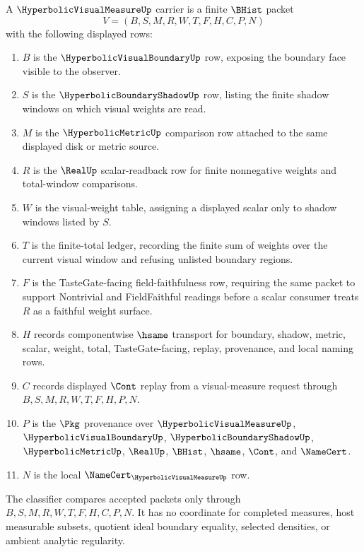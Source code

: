 \begin{definition}
\label{def:hyperbolic-visual-measure-carrier}
A $\HyperbolicVisualMeasureUp$ carrier is a finite $\BHist$ packet
$$
V=(B,S,M,R,W,T,F,H,C,P,N)
$$
with the following displayed rows:
\begin{enumerate}
\item $B$ is the $\HyperbolicVisualBoundaryUp$ row, exposing the boundary face visible to the observer.
\item $S$ is the $\HyperbolicBoundaryShadowUp$ row, listing the finite shadow windows on which visual weights are read.
\item $M$ is the $\HyperbolicMetricUp$ comparison row attached to the same displayed disk or metric source.
\item $R$ is the $\RealUp$ scalar-readback row for finite nonnegative weights and total-window comparisons.
\item $W$ is the visual-weight table, assigning a displayed scalar only to shadow windows listed by $S$.
\item $T$ is the finite-total ledger, recording the finite sum of weights over the current visual window and refusing unlisted boundary regions.
\item $F$ is the TasteGate-facing field-faithfulness row, requiring the same packet to support Nontrivial and FieldFaithful readings before a scalar consumer treats $R$ as a faithful weight surface.
\item $H$ records componentwise $\hsame$ transport for boundary, shadow, metric, scalar, weight, total, TasteGate-facing, replay, provenance, and local naming rows.
\item $C$ records displayed $\Cont$ replay from a visual-measure request through $B,S,M,R,W,T,F,H,P,N$.
\item $P$ is the $\Pkg$ provenance over $\HyperbolicVisualMeasureUp$, $\HyperbolicVisualBoundaryUp$, $\HyperbolicBoundaryShadowUp$, $\HyperbolicMetricUp$, $\RealUp$, $\BHist$, $\hsame$, $\Cont$, and $\NameCert$.
\item $N$ is the local $\NameCert_{\HyperbolicVisualMeasureUp}$ row.
\end{enumerate}
The classifier compares accepted packets only through $B,S,M,R,W,T,F,H,C,P,N$. It has no coordinate for completed measures, host measurable subsets, quotient ideal boundary equality, selected densities, or ambient analytic regularity.
\end{definition}

